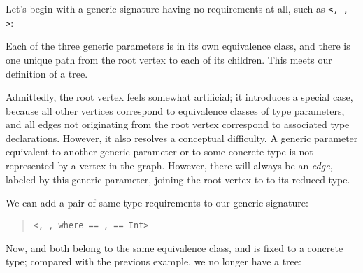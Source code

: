 \documentclass[../generics]{subfiles}
\begin{document}
\begin{example}
Let's begin with a generic signature having no requirements at all, such as \texttt{<, , >}:
\begin{quote}
\end{quote}
Each of the three generic parameters is in its own equivalence class, and there is one unique path from the root vertex to each of its children. This meets our definition of a tree.
\end{example}

Admittedly, the root vertex feels somewhat artificial; it introduces a special case, because all other vertices correspond to equivalence classes of type parameters, and all edges not originating from the root vertex correspond to associated type declarations. However, it also resolves a conceptual difficulty. A generic parameter equivalent to another generic parameter or to some concrete type is not represented by a vertex in the graph. However, there will always be an \emph{edge}, labeled by this generic parameter, joining the root vertex to to its reduced type.

\begin{example} We can add a pair of same-type requirements to our generic signature:
\begin{quote}
\texttt{<, ,  where  == ,  == Int>}
\end{quote}
Now,  and  both belong to the same equivalence class, and  is fixed to a concrete type; compared with the previous example, we no longer have a tree:
\begin{quote}
\end{quote}
\end{example}
\end{document}
